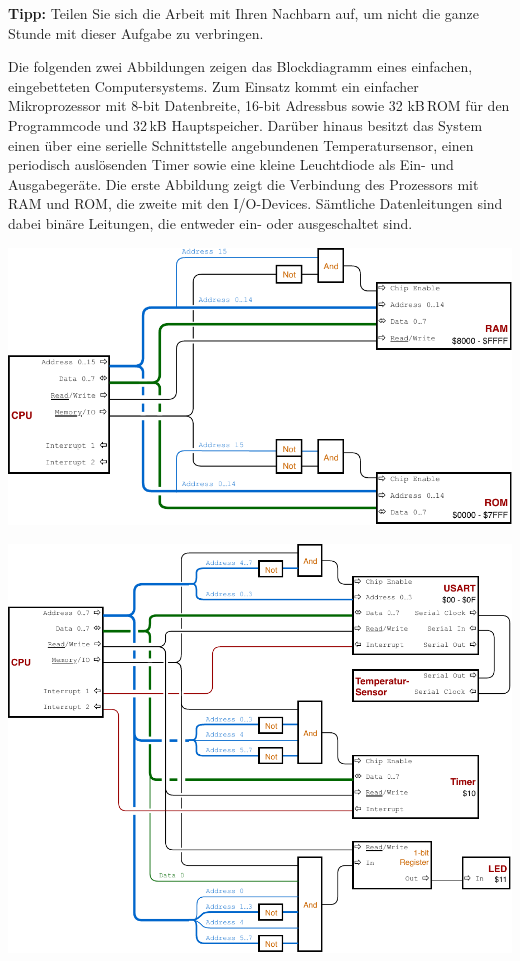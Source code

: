 \textbf{Tipp:} Teilen Sie sich die Arbeit mit Ihren Nachbarn auf, um nicht die
ganze Stunde mit dieser Aufgabe zu verbringen. \smiley

\bigskip
\teilaufgabe
Die folgenden zwei Abbildungen zeigen das Blockdiagramm eines einfachen,
eingebetteten Computersystems. Zum Einsatz kommt ein einfacher Mikroprozessor
mit 8-bit Datenbreite, 16-bit Adressbus sowie 32 kB\,ROM für den Programmcode
und 32\,kB Hauptspeicher. Darüber hinaus besitzt das System einen über eine
serielle Schnittstelle angebundenen Temperatursensor, einen periodisch
auslösenden Timer sowie eine kleine Leuchtdiode als Ein- und Ausgabegeräte.
Die erste Abbildung zeigt die Verbindung des Prozessors mit RAM und ROM, die
zweite mit den I/O-Devices. Sämtliche Datenleitungen sind dabei binäre Leitungen,
die entweder ein- oder ausgeschaltet sind.

\bigskip
\includegraphics[width=\textwidth]{1-grundlagen/img/aufgabe-rechnerarchitektur-1}

\includegraphics[width=\textwidth]{1-grundlagen/img/aufgabe-rechnerarchitektur-2}
\bigskip

